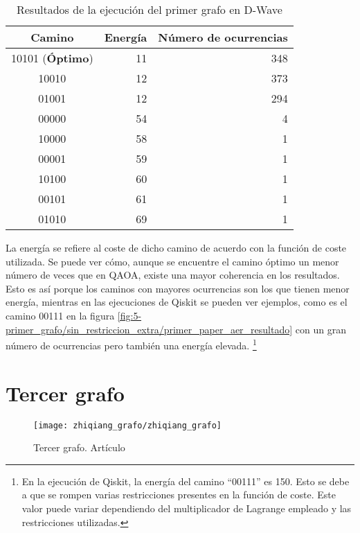 \documentclass{article}
\begin{document}
\begin{table}[htbp]
  \centering
  \begin{tabular}{|c|r|r|}
    \hline
    \textbf{Camino} & \textbf{Energía} & \textbf{Número de ocurrencias} \\ \hline
    10101 (\textbf{Óptimo}) & 11 & 348 \\ \hline
    10010                   & 12 & 373 \\ \hline
    01001                   & 12 & 294 \\ \hline
    00000                   & 54 &   4 \\ \hline
    10000                   & 58 &   1 \\ \hline
    00001                   & 59 &   1 \\ \hline
    10100                   & 60 &   1 \\ \hline
    00101                   & 61 &   1 \\ \hline
    01010                   & 69 &   1 \\ \hline
  \end{tabular}
  \caption{Resultados de la ejecución del primer grafo en D-Wave}
  \label{tab:5-primer-dwave_estadisticas}
\end{table}

La energía se refiere al coste de dicho camino de acuerdo con la función de coste utilizada. Se puede ver cómo, aunque se encuentre el camino óptimo un menor número de veces que en QAOA, existe una mayor coherencia en los resultados. Esto es así porque los caminos con mayores ocurrencias son los que tienen menor energía, mientras en las ejecuciones de Qiskit se pueden ver ejemplos, como es el camino 00111 en la figura \ref{fig:5-primer_grafo/sin_restriccion_extra/primer_paper_aer_resultado} con un gran número de ocurrencias pero también una energía elevada.
\footnote{En la ejecución de Qiskit, la energía del camino ``00111'' es 150. Esto se debe a que se rompen varias restricciones presentes en la función de coste. Este valor puede variar dependiendo del multiplicador de Lagrange empleado
  y las restricciones utilizadas.}

\section{Tercer grafo}

\begin{figure}[htbp]
  \centering
  \texttt{[image: zhiqiang\_grafo/zhiqiang\_grafo]}
  \caption{Tercer grafo. Artículo \cite{solving_shortest_path_with_qaoa}}
\end{figure}
\end{document}
